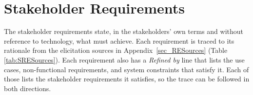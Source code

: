 \documentclass[10pt]{article}
\begin{document}
\newpage
\section{Stakeholder Requirements}
\label{sec_StakeholderReqs}

The stakeholder requirements state, in the stakeholders' own terms and without reference
to technology, what \progname{} must achieve. Each requirement is traced to its rationale from the elicitation sources in
Appendix~\ref{sec_RESources} (Table \ref{tab:SRESources}). Each requirement also has a
\textit{Refined by} line that lists the use cases, non-functional requirements,
and system constraints that satisfy it. Each of those lists the stakeholder
requirements it satisfies, so the trace can be followed in both directions.
\end{document}
